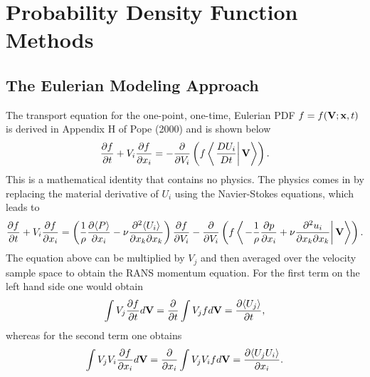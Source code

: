 \documentclass[oneside,a4paper,11pt]{report}
\begin{document}
%
\chapter{Probability Density Function Methods}
%

\section{The Eulerian Modeling Approach}

The transport equation for the one-point, one-time, Eulerian PDF $f=f(\mathbf{V} ;\mathbf{x},t)$ is derived in Appendix H of Pope (2000) and is shown below
\begin{equation}
\frac{\partial f}{\partial t} + V_i\frac{\partial f}{\partial x_i} = -\frac{\partial}{\partial V_i} \left ( f \left < \left . \frac{DU_i}{Dt} \right | \mathbf{V} \right > \right ).
\end{equation}
This is a mathematical identity that contains no physics. The physics comes in by replacing the material derivative of $U_i$ using the Navier-Stokes equations, which leads to
\begin{equation}
\label{pdf_ns}
\frac{\partial f}{\partial t} + V_i\frac{\partial f}{\partial x_i} = \left ( \frac{1}{\rho} \frac{\partial \langle P \rangle}{\partial x_i} -\nu \frac{\partial^2 \langle U_i \rangle}{\partial x_k \partial x_k} \right) \frac{\partial f}{\partial V_i} - \frac{\partial}{\partial V_i} \left ( f \left < \left . - \frac{1}{\rho} \frac{\partial p}{\partial x_i} +  \nu \frac{\partial ^2 u_i}{\partial x_k \partial x_k} \right | \mathbf{V} \right > \right ).
\end{equation}
The equation above can be multiplied by $V_j$ and then averaged over the velocity sample space to obtain the RANS momentum equation. For the first term on the left hand side one would obtain
\begin{equation}
\int V_j \frac{\partial f}{\partial t} d\mathbf{V} = \frac{\partial}{\partial t} \int V_j f d\mathbf{V} = \frac{\partial \langle U_j \rangle}{\partial t},
\end{equation} 
whereas for the second term one obtains
\begin{equation}
\int V_j V_i \frac{\partial f}{\partial x_i} d\mathbf{V} = \frac{\partial}{\partial x_i} \int V_j V_i f d\mathbf{V} = \frac{\partial \langle U_j U_i \rangle}{\partial x_i}.
\end{equation} 
\end{document}
